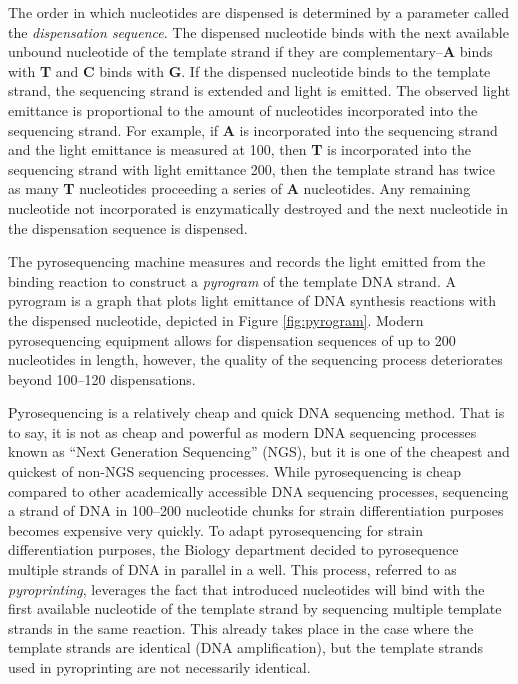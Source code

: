 \documentclass[12pt]{ucthesis}
\begin{document}
      The order in which nucleotides are dispensed is determined by
      a parameter called the \textit{dispensation sequence}. The dispensed
      nucleotide binds with the next available unbound nucleotide of the
      template strand if they are complementary--\textbf{A} binds with
      \textbf{T} and \textbf{C} binds with \textbf{G}. If the dispensed
      nucleotide binds to the template strand, the sequencing strand is
      extended and light is emitted. The observed light emittance is
      proportional to the amount of nucleotides incorporated into the
      sequencing strand. For example, if \textbf{A} is incorporated into the
      sequencing strand and the light emittance is measured at 100, then
      \textbf{T} is incorporated into the sequencing strand with light
      emittance 200, then the template strand has twice as many \textbf{T}
      nucleotides proceeding a series of \textbf{A} nucleotides. Any remaining
      nucleotide not incorporated is enzymatically destroyed and the next
      nucleotide in the dispensation sequence is dispensed.
      
      The pyrosequencing machine measures and records the light emitted from
      the binding reaction to construct a \textit{pyrogram} of the template DNA
      strand. A pyrogram is a graph that plots light emittance of DNA synthesis
      reactions with the dispensed nucleotide, depicted in Figure
      \ref{fig:pyrogram}. Modern pyrosequencing equipment allows for
      dispensation sequences of up to 200 nucleotides in length, however, the
      quality of the sequencing process deteriorates beyond 100--120
      dispensations.

      Pyrosequencing is a relatively cheap and quick DNA sequencing method.
      That is to say, it is not as cheap and powerful as modern DNA sequencing
      processes known as ``Next Generation Sequencing'' (NGS), but it is one of
      the cheapest and quickest of non-NGS sequencing processes. While
      pyrosequencing is cheap compared to other academically accessible DNA
      sequencing processes, sequencing a strand of DNA in 100--200 nucleotide
      chunks for strain differentiation purposes becomes expensive very
      quickly. To adapt pyrosequencing for strain differentiation purposes, the
      Biology department decided to pyrosequence multiple strands of DNA in
      parallel in a well. This process, referred to as \textit{pyroprinting},
      leverages the fact that introduced nucleotides will bind with the first
      available nucleotide of the template strand by sequencing multiple
      template strands in the same reaction. This already takes place in the
      case where the template strands are identical (DNA amplification), but
      the template strands used in pyroprinting are not necessarily identical.
\end{document}
